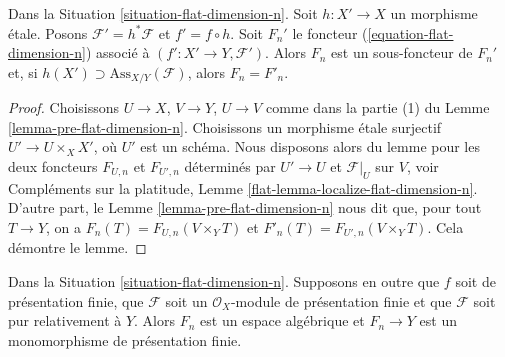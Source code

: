\begin{lemma}
\label{lemma-localize-flat-dimension-n}
Dans la Situation \ref{situation-flat-dimension-n}.
Soit $h : X' \to X$ un morphisme \'etale.
Posons $\mathcal{F}' = h^*\mathcal{F}$ et $f' = f \circ h$.
Soit $F_n'$ le foncteur (\ref{equation-flat-dimension-n})
associé à $(f' : X' \to Y, \mathcal{F}')$.
Alors $F_n$ est un sous-foncteur de $F_n'$ et, si
$h(X') \supset \text{Ass}_{X/Y}(\mathcal{F})$, alors $F_n = F'_n$.
\end{lemma}

\begin{proof}
Choisissons $U \to X$, $V \to Y$, $U \to V$ comme dans la partie (1) du
Lemme \ref{lemma-pre-flat-dimension-n}. Choisissons un morphisme \'etale
surjectif $U' \to U \times_X X'$, où $U'$ est un schéma.
Nous disposons alors du lemme pour les deux foncteurs
$F_{U, n}$ et $F_{U', n}$ déterminés par $U' \to U$ et $\mathcal{F}|_U$
sur $V$, voir
Compléments sur la platitude, Lemme \ref{flat-lemma-localize-flat-dimension-n}.
D'autre part, le Lemme \ref{lemma-pre-flat-dimension-n}
nous dit que, pour tout $T \to Y$, on a
$F_n(T) = F_{U, n}(V \times_Y T)$
et
$F'_n(T) = F_{U', n}(V \times_Y T)$.
Cela démontre le lemme.
\end{proof}

\begin{theorem}
\label{theorem-flat-dimension-n-representable}
Dans la Situation \ref{situation-flat-dimension-n}.
Supposons en outre que $f$ soit de présentation finie, que
$\mathcal{F}$ soit un $\mathcal{O}_X$-module de présentation finie
et que $\mathcal{F}$ soit pur relativement à $Y$.
Alors $F_n$ est un espace algébrique et
$F_n \to Y$ est un monomorphisme de présentation finie.
\end{theorem}


